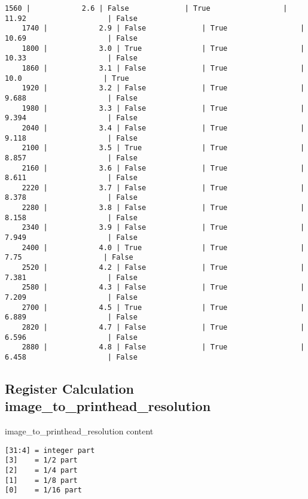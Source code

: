 \documentclass{article}
\begin{document}
\begin{Verbatim}[commandchars=\\\{\}]
    1560 |            2.6 | False             | True                 |   11.92                   | False
    1740 |            2.9 | False             | True                 |   10.69                   | False
    1800 |            3.0 | True              | True                 |   10.33                   | False
    1860 |            3.1 | False             | True                 |    10.0                   | True
    1920 |            3.2 | False             | True                 |   9.688                   | False
    1980 |            3.3 | False             | True                 |   9.394                   | False
    2040 |            3.4 | False             | True                 |   9.118                   | False
    2100 |            3.5 | True              | True                 |   8.857                   | False
    2160 |            3.6 | False             | True                 |   8.611                   | False
    2220 |            3.7 | False             | True                 |   8.378                   | False
    2280 |            3.8 | False             | True                 |   8.158                   | False
    2340 |            3.9 | False             | True                 |   7.949                   | False
    2400 |            4.0 | True              | True                 |    7.75                   | False
    2520 |            4.2 | False             | True                 |   7.381                   | False
    2580 |            4.3 | False             | True                 |   7.209                   | False
    2700 |            4.5 | True              | True                 |   6.889                   | False
    2820 |            4.7 | False             | True                 |   6.596                   | False
    2880 |            4.8 | False             | True                 |   6.458                   | False
    \end{Verbatim}

    \subsection{Register Calculation
image\_to\_printhead\_resolution}\label{register-calculation-imageux5ftoux5fprintheadux5fresolution}

    image\_to\_printhead\_resolution content

\begin{verbatim}
[31:4] = integer part
[3]    = 1/2 part
[2]    = 1/4 part
[1]    = 1/8 part
[0]    = 1/16 part
\end{verbatim}
\end{document}
